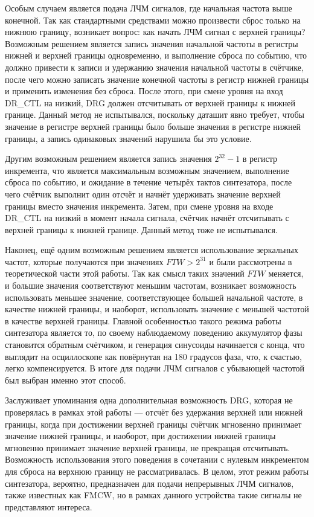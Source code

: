 \documentclass[rusmathsym, eqnumwithinsec, amspack, hyperref]{bomgost}
\begin{document}
Особым случаем является подача ЛЧМ сигналов, где начальная частота выше конечной. Так как стандартными средствами можно произвести сброс только на нижнюю границу, возникает вопрос: как начать ЛЧМ сигнал с верхней границы? Возможным решением является запись значения начальной частоты в регистры нижней и верхней границы одновременно, и выполнение сброса по событию, что должно привести к записи и удержанию значения начальной частоты в счётчике, после чего можно записать значение конечной частоты в регистр нижней границы и применить изменения без сброса. После этого, при смене уровня на вход DR\_CTL на низкий, DRG должен отсчитывать от верхней границы к нижней границе. Данный метод не испытывался, поскольку даташит явно требует, чтобы значение в регистре верхней границы было больше значения в регистре нижней границы, а запись одинаковых значений нарушила бы это условие.

Другим возможным решением является запись значения $2^{32}-1$ в регистр инкремента, что является максимальным возможным значением, выполнение сброса по событию, и ожидание в течение четырёх тактов синтезатора, после чего счётчик выполнит один отсчёт и начнёт удерживать значение верхней границы вместо значения инкремента. Затем, при смене уровня на входе DR\_CTL на низкий в момент начала сигнала, счётчик начнёт отсчитывать с верхней границы к нижней границе. Данный метод тоже не испытывался.

Наконец, ещё одним возможным решением является использование зеркальных частот, которые получаются при значениях $FTW > 2^{31}$ и были рассмотрены в теоретической части этой работы. Так как смысл таких значений $FTW$ меняется, и большие значения соответствуют меньшим частотам, возникает возможность использовать меньшее значение, соответствующее большей начальной частоте, в качестве нижней границы, и наоборот, использовать значение с меньшей частотой в качестве верхней границы. Главной особенностью такого режима работы синтезатора является то, по своему наблюдаемому поведению аккумулятор фазы становится обратным счётчиком, и генерация синусоиды начинается с конца, что выглядит на осциллоскопе как повёрнутая на 180 градусов фаза, что, к счастью, легко компенсируется. В итоге для подачи ЛЧМ сигналов с убывающей частотой был выбран именно этот способ.

Заслуживает упоминания одна дополнительная возможность DRG, которая не проверялась в рамках этой работы --- отсчёт без удержания верхней или нижней границы, когда при достижении верхней границы счётчик мгновенно принимает значение нижней границы, и наоборот, при достижении нижней границы мгновенно принимает значение верхней границы, не прекращая отсчитывать. Возможность использования этого поведения в сочетании с нулевым инкрементом для сброса на верхнюю границу не рассматривалась. В целом, этот режим работы синтезатора, вероятно, предназначен для подачи непрерывных ЛЧМ сигналов, также известных как FMCW, но в рамках данного устройства такие сигналы не представляют интереса.
\end{document}
